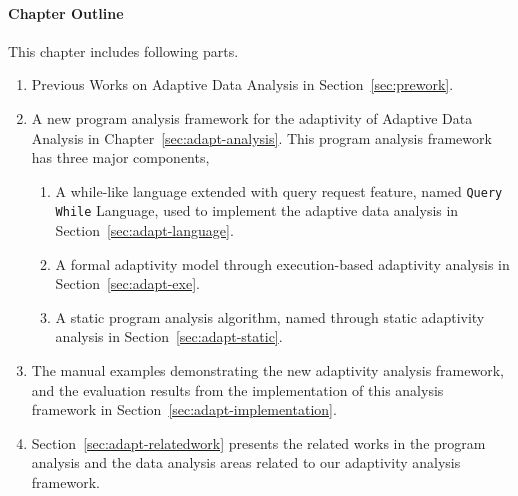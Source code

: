 \paragraph*{Chapter Outline}
This chapter includes following parts. 
\begin{enumerate}
   \item Previous Works on Adaptive Data Analysis in Section~\ref{sec:prework}.
   \item A new program analysis framework for the adaptivity of Adaptive Data Analysis in Chapter~\ref{sec:adapt-analysis}.
   This program analysis framework has three major components,
   \begin{enumerate}
      \item A while-like language extended with query request feature, named {\tt Query While} Language, 
      used to implement the adaptive data analysis in Section~\ref{sec:adapt-language}. 
      \item A formal adaptivity model through execution-based adaptivity analysis in Section~\ref{sec:adapt-exe}.
      \item A static program analysis algorithm, named {\THESYSTEM} through static adaptivity analysis in Section~\ref{sec:adapt-static}.
   \end{enumerate}
   \item The manual examples demonstrating the new adaptivity analysis framework, and the evaluation results from the implementation
   of this analysis framework in Section~\ref{sec:adapt-implementation}.
   \item Section~\ref{sec:adapt-relatedwork} presents the related works in the program analysis and the data analysis areas
   related to our adaptivity analysis framework.
\end{enumerate}



